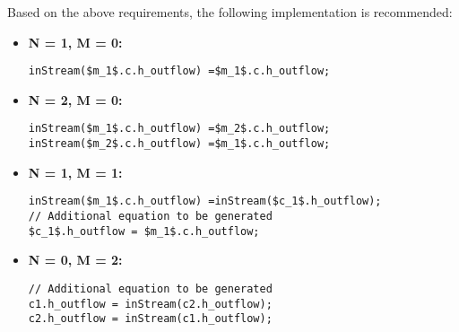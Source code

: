 \begin{nonnormative}
Based on the above requirements, the following implementation is recommended:
\begin{itemize}
\raggedright
\item \textbf{N = 1, M = 0:}\newline
\begin{lstlisting}[language=modelica,mathescape=true]
inStream($m_1$.c.h_outflow) =$m_1$.c.h_outflow;
\end{lstlisting}
\item
\textbf{N = 2, M = 0:}\newline
\begin{lstlisting}[language=modelica,mathescape=true]
inStream($m_1$.c.h_outflow) =$m_2$.c.h_outflow;
inStream($m_2$.c.h_outflow) =$m_1$.c.h_outflow;
\end{lstlisting}
\item \textbf{N = 1, M = 1:}\newline
\begin{lstlisting}[language=modelica,mathescape=true]
inStream($m_1$.c.h_outflow) =inStream($c_1$.h_outflow);
// Additional equation to be generated
$c_1$.h_outflow = $m_1$.c.h_outflow;
\end{lstlisting}
\item \textbf{N = 0, M = 2:}\newline
\begin{lstlisting}[language=modelica,mathescape=true]
// Additional equation to be generated
c1.h_outflow = inStream(c2.h_outflow);
c2.h_outflow = inStream(c1.h_outflow);
\end{lstlisting}


\end{itemize}
\end{nonnormative}
